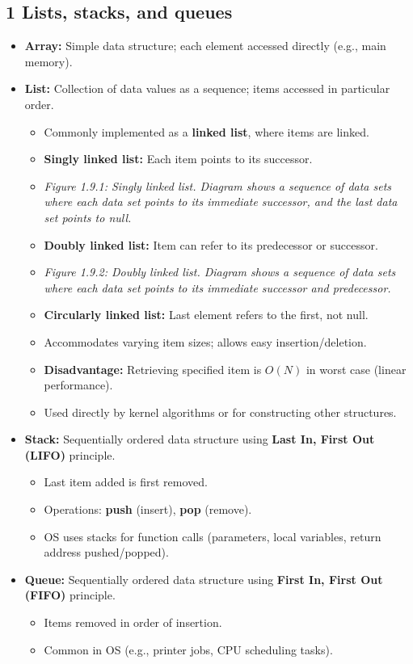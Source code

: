 \documentclass{article}
\begin{document}
\subsection*{1 Lists, stacks, and queues}
\begin{itemize}
    \item \textbf{Array:} Simple data structure; each element accessed directly (e.g., main memory).
    \item \textbf{List:} Collection of data values as a sequence; items accessed in particular order.
    \begin{itemize}
        \item Commonly implemented as a \textbf{linked list}, where items are linked.
        \item \textbf{Singly linked list:} Each item points to its successor.
        \item \textit{Figure 1.9.1: Singly linked list. Diagram shows a sequence of data sets where each data set points to its immediate successor, and the last data set points to null.}
        \item \textbf{Doubly linked list:} Item can refer to its predecessor or successor.
        \item \textit{Figure 1.9.2: Doubly linked list. Diagram shows a sequence of data sets where each data set points to its immediate successor and predecessor.}
        \item \textbf{Circularly linked list:} Last element refers to the first, not null.
        \item Accommodates varying item sizes; allows easy insertion/deletion.
        \item \textbf{Disadvantage:} Retrieving specified item is $O(N)$ in worst case (linear performance).
        \item Used directly by kernel algorithms or for constructing other structures.
    \end{itemize}
    \item \textbf{Stack:} Sequentially ordered data structure using \textbf{Last In, First Out (LIFO)} principle.
    \begin{itemize}
        \item Last item added is first removed.
        \item Operations: \textbf{push} (insert), \textbf{pop} (remove).
        \item OS uses stacks for function calls (parameters, local variables, return address pushed/popped).
    \end{itemize}
    \item \textbf{Queue:} Sequentially ordered data structure using \textbf{First In, First Out (FIFO)} principle.
    \begin{itemize}
        \item Items removed in order of insertion.
        \item Common in OS (e.g., printer jobs, CPU scheduling tasks).
    \end{itemize}
\end{itemize}
\end{document}
